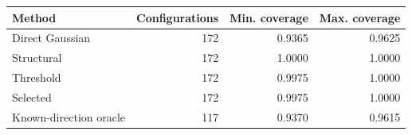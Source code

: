 \begin{tabular}{lrrr}
\toprule
Method & Configurations & Min. coverage & Max. coverage \\
\midrule
Direct Gaussian & 172 & 0.9365 & 0.9625 \\
Structural & 172 & 1.0000 & 1.0000 \\
Threshold & 172 & 0.9975 & 1.0000 \\
Selected & 172 & 0.9975 & 1.0000 \\
Known-direction oracle & 117 & 0.9370 & 0.9615 \\
\bottomrule
\end{tabular}
